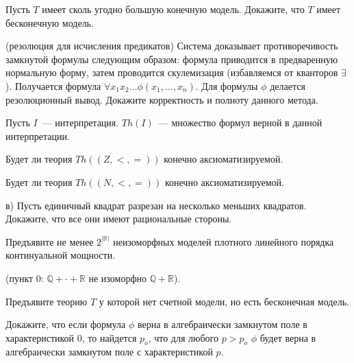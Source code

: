 \setcounter{curtask}{31}


\begin{task}
    Пусть $T$ имеет сколь угодно большую конечную модель. Докажите, что $T$ имеет
    бесконечную модель.
\end{task}

\begin{task}(резолюция для исчисления предикатов)
    Система доказывает противоречивость замкнутой формулы следующим
    образом: формула приводится в предваренную нормальную форму, затем
    проводится скулемизация (избавляемся от кванторов $\exists$). Получается формула
    $\forall x_1 x_2 \dots \phi(x_1, \dots, x_n)$. Для формулы $\phi$ делается
    резолюционный вывод. Докажите корректность и полноту данного метода.
\end{task}


Пусть $I$~--- интерпретация. $Th(I)$~--- множество формул верной в
данной интерпретации.

\begin{task}
    Будет ли теория $Th((Z, <, =))$ конечно аксиоматизируемой.
\end{task}

\begin{task}
    Будет ли теория $Th((N, <, =))$ конечно аксиоматизируемой.
\end{task}


\breakline

\begin{ptask}{24}
    в) Пусть единичный квадрат разрезан на несколько меньших
    квадратов. Докажите, что все они имеют рациональные стороны.
\end{ptask}

\begin{ptask}{26}
    Предъявите не менее $2^{|\mathbb{R}|}$ неизоморфных моделей плотного линейного
    порядка континуальной мощности.

    (пункт 0: $\mathbb{Q} + \cdot + \mathbb{R}$ не изоморфно $\mathbb{Q} +
    \mathbb{R}$).
\end{ptask}

\begin{ptask}{27}
    Предъявите теорию $T$ у которой нет счетной модели, но есть бесконечная модель.
\end{ptask}

\begin{ptask}{28}
    Докажите, что если формула $\phi$ верна в алгебраически замкнутом
    поле в характеристикой 0, то найдется $p_o$, что для любого $p >
    p_o$ $\phi$ будет верна в алгебраически замкнутом поле с
    характеристикой $p$.
\end{ptask}